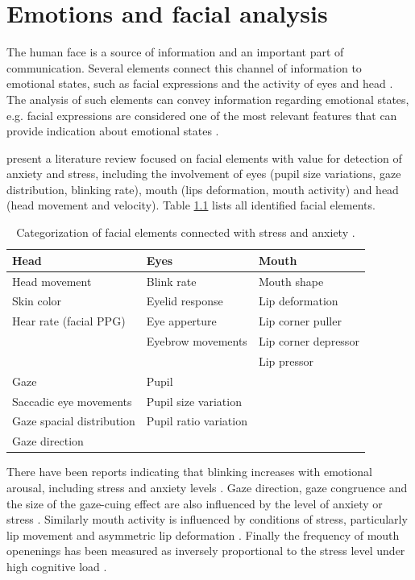 \chapter{Emotions and facial analysis}

The human face is a source of information and an important part of communication. Several elements connect this channel of information to emotional states, such as facial expressions and the activity of eyes and head \parencite{akakin2010spatiotemporal}. The analysis of such elements can convey information regarding emotional states, e.g. facial expressions are considered one of the most relevant features that can provide indication about emotional states \parencite{cowie2001emotion}.

\textcite{giannakakis2017stress} present a literature review focused on facial elements with value for detection of anxiety and stress, including the involvement of eyes (pupil size variations, gaze distribution, blinking rate), mouth (lips deformation, mouth activity) and head (head movement and velocity). Table \ref{table:stress-facial-features} lists all identified facial elements.

\begin{table}[h]
\begin{tabular}{lll}%
\toprule%
Head & Eyes & Mouth \\
\midrule
Head movement & Blink rate & Mouth shape \\
Skin color & Eyelid response & Lip deformation  \\
Hear rate (facial PPG) & Eye apperture & Lip corner puller \\
& Eyebrow movements & Lip corner depressor \\
& & Lip pressor \\
\midrule
Gaze & Pupil & \\
\midrule
Saccadic eye movements & Pupil size variation &  \\
Gaze spacial distribution & Pupil ratio variation &  \\
Gaze direction & &\\
\bottomrule%
\end{tabular}%
\caption{Categorization of facial elements connected with stress and anxiety \parencite{giannakakis2017stress}.}
\label{table:stress-facial-features}
\end{table}

There have been reports indicating that blinking increases with emotional arousal, including stress and anxiety levels \parencite{dinges2005optical}. Gaze direction, gaze congruence and the size of the gaze-cuing effect are also influenced by the level of anxiety or stress \parencite{staab2014influence}. Similarly mouth activity is influenced by conditions of stress, particularly lip movement \parencite{dinges2005optical} and asymmetric lip deformation \parencite{metaxas2004image}. Finally the frequency of mouth openenings has been measured as inversely proportional to the stress level under high cognitive load \parencite{liao2005decision}.

